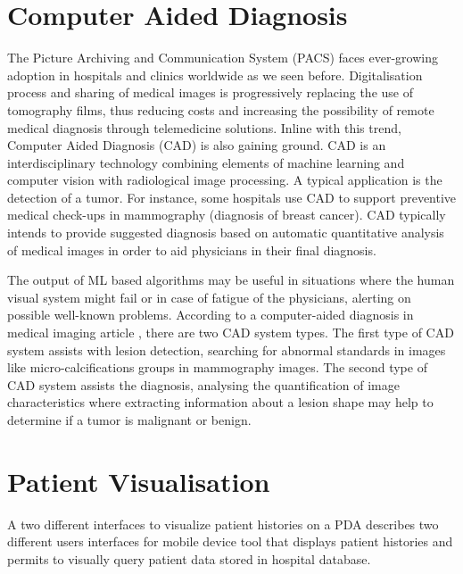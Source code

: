 \section{Computer Aided Diagnosis}

The Picture Archiving and Communication System (PACS) \cite{oosterwijk2004pacs} faces ever-growing adoption in hospitals and clinics worldwide \cite{lemke2003pacs} as we seen before. Digitalisation process and sharing of medical images is progressively replacing the use of tomography films, thus reducing costs and increasing the possibility of remote medical diagnosis through telemedicine solutions. Inline with this trend, Computer Aided Diagnosis (CAD) \cite{giger1993computer} is also gaining ground. CAD is an interdisciplinary technology combining elements of machine learning and computer vision with radiological image processing. A typical application is the detection of a tumor. For instance, some hospitals use CAD to support preventive medical check-ups in mammography (diagnosis of breast cancer). CAD typically intends to provide suggested diagnosis based on automatic quantitative analysis of medical images in order to aid physicians in their final diagnosis.

\clearpage

The output of ML based algorithms may be useful in situations where the human visual system might fail or in case of fatigue of the physicians, alerting on possible well-known problems. According to a computer-aided diagnosis in medical imaging article \cite{giger1993computer}, there are two CAD system types. The first type of CAD system assists with lesion detection, searching for abnormal standards in images like micro-calcifications groups in mammography images. The second type of CAD system assists the diagnosis, analysing the quantification of image characteristics where extracting information about a lesion shape may help to determine if a tumor is malignant or benign.

\section{Patient Visualisation}

A two different interfaces to visualize patient histories on a PDA \cite{ardito2006two} describes two different users interfaces for mobile device tool that displays patient histories and permits to visually query patient data stored in hospital database.

